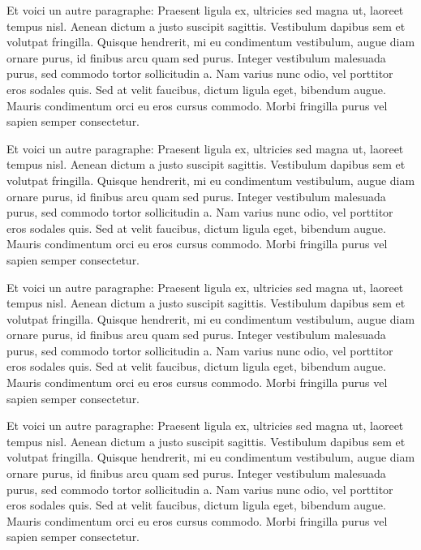 \documentclass{lecture}
\begin{document}
\begin{example}[]{}
    Et voici un autre paragraphe: Praesent ligula ex, ultricies sed magna ut,
    laoreet tempus nisl. Aenean dictum a justo suscipit sagittis. Vestibulum dapibus
    sem et volutpat fringilla. Quisque hendrerit, mi eu condimentum vestibulum,
    augue diam ornare purus, id finibus arcu quam sed purus. Integer vestibulum
    malesuada purus, sed commodo tortor sollicitudin a. Nam varius nunc odio, vel
    porttitor eros sodales quis. Sed at velit faucibus, dictum ligula eget, bibendum
    augue. Mauris condimentum orci eu eros cursus commodo. Morbi fringilla purus vel
    sapien semper consectetur.


    Et voici un autre paragraphe: Praesent ligula ex, ultricies sed magna ut,
    laoreet tempus nisl. Aenean dictum a justo suscipit sagittis. Vestibulum dapibus
    sem et volutpat fringilla. Quisque hendrerit, mi eu condimentum vestibulum,
    augue diam ornare purus, id finibus arcu quam sed purus. Integer vestibulum
    malesuada purus, sed commodo tortor sollicitudin a. Nam varius nunc odio, vel
    porttitor eros sodales quis. Sed at velit faucibus, dictum ligula eget, bibendum
    augue. Mauris condimentum orci eu eros cursus commodo. Morbi fringilla purus vel
    sapien semper consectetur. 

    Et voici un autre paragraphe: Praesent ligula ex, ultricies sed magna ut,
    laoreet tempus nisl. Aenean dictum a justo suscipit sagittis. Vestibulum dapibus
    sem et volutpat fringilla. Quisque hendrerit, mi eu condimentum vestibulum,
    augue diam ornare purus, id finibus arcu quam sed purus. Integer vestibulum
    malesuada purus, sed commodo tortor sollicitudin a. Nam varius nunc odio, vel
    porttitor eros sodales quis. Sed at velit faucibus, dictum ligula eget, bibendum
    augue. Mauris condimentum orci eu eros cursus commodo. Morbi fringilla purus vel
    sapien semper consectetur. 

    Et voici un autre paragraphe: Praesent ligula ex, ultricies sed magna ut,
    laoreet tempus nisl. Aenean dictum a justo suscipit sagittis. Vestibulum dapibus
    sem et volutpat fringilla. Quisque hendrerit, mi eu condimentum vestibulum,
    augue diam ornare purus, id finibus arcu quam sed purus. Integer vestibulum
    malesuada purus, sed commodo tortor sollicitudin a. Nam varius nunc odio, vel
    porttitor eros sodales quis. Sed at velit faucibus, dictum ligula eget, bibendum
    augue. Mauris condimentum orci eu eros cursus commodo. Morbi fringilla purus vel
    sapien semper consectetur. 


\end{example}
\end{document}
